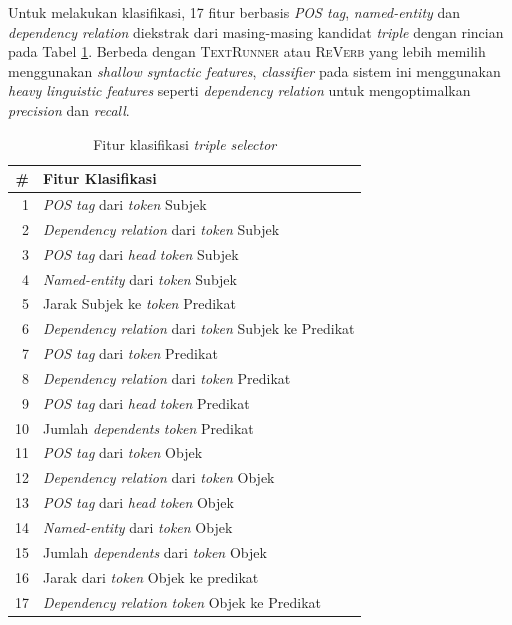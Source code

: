 Untuk melakukan klasifikasi, 17 fitur berbasis \textit{POS tag}, \textit{named-entity} dan \textit{dependency relation} diekstrak dari masing-masing kandidat \textit{triple} dengan rincian pada Tabel \ref{tab:models_features}. Berbeda dengan \textsc{TextRunner} atau \textsc{ReVerb} \citep{banko2007open} \citep{etzioni2011open} yang lebih memilih menggunakan \textit{shallow syntactic features}, \textit{classifier} pada sistem ini menggunakan \textit{heavy linguistic features} seperti \textit{dependency relation} untuk mengoptimalkan \textit{precision} dan \textit{recall}.

\begin{table}
\caption{Fitur klasifikasi \textit{triple selector}}
\label{tab:models_features}
\centering
\begin{tabular}{r l}
\hline
\textbf{\#} & \textbf{Fitur Klasifikasi} \\
\hline
1 & \textit{POS tag} dari \textit{token} Subjek \\
2 & \textit{Dependency relation} dari \textit{token} Subjek \\
3 & \textit{POS tag} dari \textit{head} \textit{token} Subjek \\
4 & \textit{Named-entity} dari \textit{token} Subjek \\
5 & Jarak Subjek ke \textit{token} Predikat \\
6 & \textit{Dependency relation} dari \textit{token} Subjek ke Predikat \\
7 & \textit{POS tag} dari \textit{token} Predikat \\
8 & \textit{Dependency relation} dari \textit{token} Predikat \\
9 & \textit{POS tag} dari \textit{head} \textit{token} Predikat \\
10 & Jumlah \textit{dependents} \textit{token} Predikat \\
11 & \textit{POS tag} dari \textit{token} Objek \\
12 & \textit{Dependency relation} dari \textit{token} Objek \\
13 & \textit{POS tag} dari \textit{head} \textit{token} Objek \\
14 & \textit{Named-entity} dari \textit{token} Objek \\
15 & Jumlah \textit{dependents} dari \textit{token} Objek \\
16 & Jarak dari \textit{token} Objek ke predikat \\
17 & \textit{Dependency relation} \textit{token} Objek ke Predikat  \\
\end{tabular}
\end{table}

